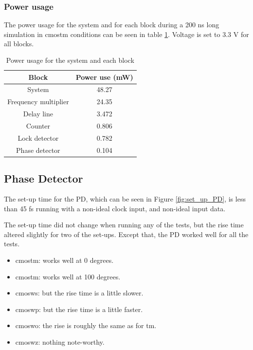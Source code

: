 \documentclass[a4paper,12pt]{article} \usepackage{graphicx}
\begin{document}
\subsubsection{Power usage}
The power usage for the system and for each block during a 200 ns long
simulation in cmostm conditions can be seen in table
\ref{tab:WS_power}. Voltage is set to 3.3 V for all blocks.
\begin{table}[h]
        \centering
        \begin{tabular}{|c|c|}
                \hline
                \textbf{Block}                & \textbf{Power use (mW)}  \\
                \hline
                System               & 48.27           \\
                Frequency multiplier & 24.35           \\
                Delay line           & 3.472           \\
                Counter              & 0.806           \\
                Lock detector        & 0.782           \\
                Phase detector       & 0.104           \\
                \hline
        \end{tabular}
        \caption{Power usage for the system and each block}
        \label{tab:WS_power}
\end{table}


\subsection{Phase Detector}
The set-up time for the PD, which can be seen in Figure \ref{fig:set_up_PD}, is less than 45 fs
running with a non-ideal clock input, and non-ideal input data.

The set-up time did not change when running any of the tests, but the rise time altered slightly
for two of the set-ups. Except that, the PD worked well for all the tests.

\begin{itemize}
        \item cmostm: works well at 0 degrees.
        \item cmostm: works well at 100 degrees.
        \item cmosws: but the rise time is a little slower.
        \item cmoswp: but the rise time is a little faster.
        \item cmoswo: the rise is roughly the same as for tm.
        \item cmoswz: nothing note-worthy.
\end{itemize}
\end{document}
